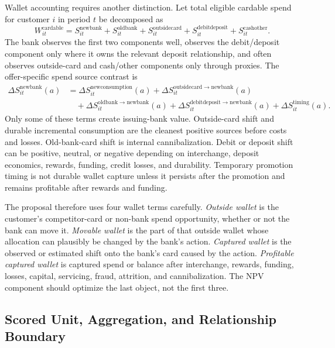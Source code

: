 \documentclass[11pt]{article}
\newcommand{\1}{\mathbf{1}}
\begin{document}
Wallet accounting requires another distinction. Let total eligible cardable
spend for customer $i$ in period $t$ be decomposed as
\begin{equation}
  W_{it}^{\mathrm{cardable}}
  =
  S_{it}^{\mathrm{newbank}}
  +S_{it}^{\mathrm{oldbank}}
  +S_{it}^{\mathrm{outsidecard}}
  +S_{it}^{\mathrm{debitdeposit}}
  +S_{it}^{\mathrm{cashother}}.
  \label{eq:wallet-accounting}
\end{equation}
The bank observes the first two components well, observes the debit/deposit
component only where it owns the relevant deposit relationship, and often
observes outside-card and cash/other components only through proxies. The
offer-specific spend source contrast is
\begin{align}
  \Delta S_{it}^{\mathrm{newbank}}(a)
  &=
  \Delta S_{it}^{\mathrm{newconsumption}}(a)
  +\Delta S_{it}^{\mathrm{outsidecard\rightarrow newbank}}(a)
  \nonumber\\
  &\quad
  +\Delta S_{it}^{\mathrm{oldbank\rightarrow newbank}}(a)
  +\Delta S_{it}^{\mathrm{debitdeposit\rightarrow newbank}}(a)
  +\Delta S_{it}^{\mathrm{timing}}(a).
  \label{eq:spend-source-panel}
\end{align}
Only some of these terms create issuing-bank value. Outside-card shift and
durable incremental consumption are the cleanest positive sources before
costs and losses. Old-bank-card shift is internal cannibalization. Debit or
deposit shift can be positive, neutral, or negative depending on interchange,
deposit economics, rewards, funding, credit losses, and durability. Temporary
promotion timing is not durable wallet capture unless it persists after the
promotion and remains profitable after rewards and funding.

The proposal therefore uses four wallet terms carefully. \emph{Outside wallet}
is the customer's competitor-card or non-bank spend opportunity, whether or
not the bank can move it. \emph{Movable wallet} is the part of that outside
wallet whose allocation can plausibly be changed by the bank's action.
\emph{Captured wallet} is the observed or estimated shift onto the bank's card
caused by the action. \emph{Profitable captured wallet} is captured spend or
balance after interchange, rewards, funding, losses, capital, servicing, fraud,
attrition, and cannibalization. The NPV component should optimize the last
object, not the first three.

\subsection{Scored Unit, Aggregation, and Relationship Boundary}
\label{subsec:scored-unit-aggregation}
\end{document}
